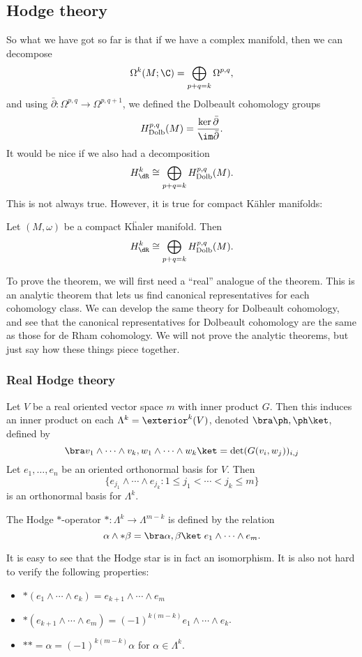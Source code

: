 \documentclass[a4paper]{article}
\newcommand\Dolb{\mathrm{Dolb}}
\begin{document}
\subsection{Hodge theory}
So what we have got so far is that if we have a complex manifold, then we can decompose
\[
  \Omega^k(M; \C) = \bigoplus_{p + q = k} \Omega^{p, q},
\]
and using $\bar{\partial}: \Omega^{p, q} \to \Omega^{p, q + 1}$, we defined the Dolbeault cohomology groups
\[
  H_{\Dolb}^{p, q}(M) = \frac{\ker \bar{\partial}}{\im \bar{\partial}}.
\]
It would be nice if we also had a decomposition
\[
  H^k_{\dR} \cong \bigoplus_{p + q = k} H^{p, q}_{\Dolb}(M).
\]
This is not always true. However, it is true for compact K\"ahler manifolds:
\begin{thm}
  Let $(M, \omega)$ be a compact K\"haler manifold. Then
  \[
    H^k_{\dR} \cong \bigoplus_{p + q = k} H^{p, q}_{\Dolb}(M).
  \]
\end{thm}
To prove the theorem, we will first need a ``real'' analogue of the theorem. This is an analytic theorem that lets us find canonical representatives for each cohomology class. We can develop the same theory for Dolbeault cohomology, and see that the canonical representatives for Dolbeault cohomology are the same as those for de Rham cohomology. We will not prove the analytic theorems, but just say how these things piece together.
\subsubsection*{Real Hodge theory}
Let $V$ be a real oriented vector space $m$ with inner product $G$. Then this induces an inner product on each $\Lambda^k = \exterior^k (V)$, denoted $\bra \ph, \ph\ket$, defined by
\[
  \bra v_1 \wedge \cdots \wedge v_k, w_1 \wedge \cdots \wedge w_k\ket = \det (G(v_i, w_j))_{i, j}
\]
Let $e_1, \ldots, e_n$ be an oriented orthonormal basis for $V$. Then
\[
  \{e_{j_1} \wedge \cdots \wedge e_{j_k} : 1 \leq j_1 < \cdots < j_k \leq m\}
\]
is an orthonormal basis for $\Lambda^k$.

\begin{defi}
  The Hodge $*$-operator \index{$*$}$*: \Lambda^k \to \Lambda^{m - k}$ is defined by the relation
  \[
    \alpha \wedge *\beta = \bra \alpha, \beta\ket\; e_1 \wedge \cdots \wedge e_m.
  \]
\end{defi}
It is easy to see that the Hodge star is in fact an isomorphism. It is also not hard to verify the following properties:
\begin{prop}\leavevmode
  \begin{itemize}
    \item $*(e_1 \wedge \cdots \wedge e_k) = e_{k + 1} \wedge \cdots \wedge e_m$
    \item $*(e_{k + 1} \wedge \cdots \wedge e_m) = (-1)^{k(m - k)} e_1 \wedge \cdots \wedge e_k$.
    \item $** =\alpha = (-1)^{k(m - k)}\alpha$ for $\alpha \in \Lambda^k$.\fakeqed
  \end{itemize}
\end{prop}
\end{document}
